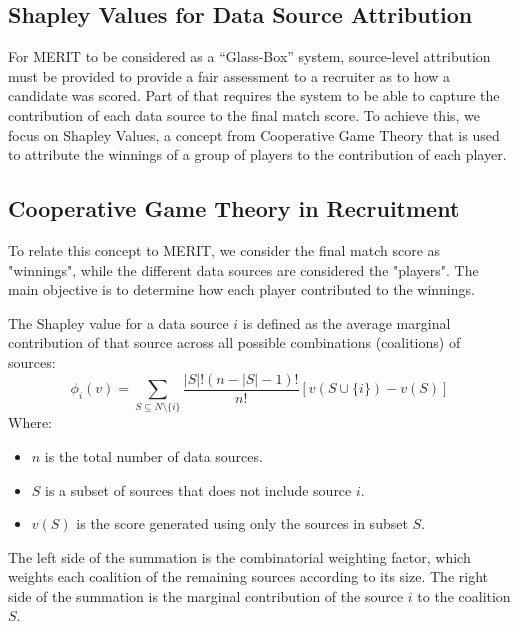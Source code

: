 \subsection*{Shapley Values for Data Source Attribution}
\label{sec:explainable-ai-shapley}

For MERIT to be considered as a ``Glass-Box'' system, source-level attribution must be provided to provide a fair assessment to a recruiter as to how a candidate was scored.
Part of that requires the system to be able to capture the contribution of each data source to the final match score.
To achieve this, we focus on Shapley Values, a concept from Cooperative Game Theory that is used to attribute the winnings of a group of players to the contribution of each player.


\subsection*{Cooperative Game Theory in Recruitment}
To relate this concept to MERIT, we consider the final match score as "winnings", while the different data sources are considered the "players".
The main objective is to determine how each player contributed to the winnings.

The Shapley value for a data source $i$ is defined as the average marginal contribution of that source across all possible combinations (coalitions) of sources:
\begin{equation} \label{eq:shapley_value}
    \phi_i(v) = \sum_{S \subseteq N \setminus \{i\}} \frac{|S|! (n - |S| - 1)!}{n!} [v(S \cup \{i\}) - v(S)]
\end{equation}
Where:
\begin{itemize}
    \item $n$ is the total number of data sources.
    \item $S$ is a subset of sources that does not include source $i$.
    \item $v(S)$ is the score generated using only the sources in subset $S$.
\end{itemize}

The left side of the summation is the combinatorial weighting factor, which weights each coalition of the remaining sources according to its size. The right side of the summation is the marginal contribution of the source $i$ to the coalition $S$.

